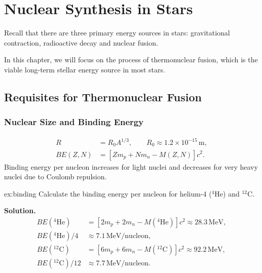 \chapter{Nuclear Synthesis in Stars}


Recall that there are three primary energy sources in stars: gravitational contraction, radioactive decay and nuclear fusion. 

In this chapter, we will focus on the process of thermonuclear fusion, which is the viable long-term stellar energy source in most stars.

\section{Requisites for Thermonuclear Fusion}

\subsection{Nuclear Size and Binding Energy}
\begin{theory}
\begin{align}
    R &= R_0A^{1/3}, \qquad R_0\approx1.2\times10^{-15}\,\text{m}, \\
    BE(Z,N) &= \left[Zm_p+Nm_n-M(Z,N)\right]c^2.
\end{align}
Binding energy per nucleon increases for light nuclei and decreases for very heavy nuclei due to Coulomb repulsion.
\end{theory}

\begin{example}{}{ex:binding}
Calculate the binding energy per nucleon for helium-4 ($^4$He) and $^{12}$C.

\smallskip\textbf{Solution.}
\begin{align*} 
BE(^4\text{He}) &= \left[2m_p + 2m_n - M(^4\text{He})\right]c^2 \approx 28.3\,\text{MeV}, \\
BE(^4\text{He})/4 &\approx 7.1\,\text{MeV/nucleon}, \\
BE(^{12}\text{C}) &= \left[6m_p + 6 m_n - M(^{12}\text{C})\right]c^2 \approx 92.2\,\text{MeV}, \\
BE(^{12}\text{C})/12 &\approx 7.7\,\text{MeV/nucleon}.
\end{align*}   
\end{example}

